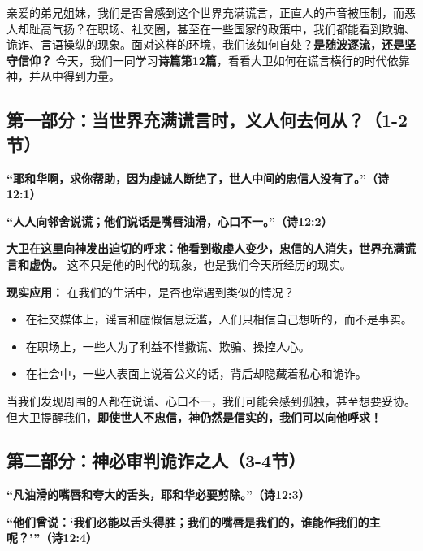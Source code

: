 \documentclass[a4paper, 12pt]{article}
\begin{document}
亲爱的弟兄姐妹，我们是否曾感到这个世界充满谎言，正直人的声音被压制，而恶人却趾高气扬？在职场、社交圈，甚至在一些国家的政策中，我们都能看到欺骗、诡诈、言语操纵的现象。面对这样的环境，我们该如何自处？\textbf{是随波逐流，还是坚守信仰？} 今天，我们一同学习\textbf{诗篇第12篇}，看看大卫如何在谎言横行的时代依靠神，并从中得到力量。  




\subsection*{第一部分：当世界充满谎言时，义人何去何从？（1-2节）}


\hspace{0.4cm}\textbf{“耶和华啊，求你帮助，因为虔诚人断绝了，世人中间的忠信人没有了。”（诗12:1）  }

\textbf{“人人向邻舍说谎；他们说话是嘴唇油滑，心口不一。”（诗12:2）  }

\vspace{0.2cm}

\textbf{大卫在这里向神发出迫切的呼求：他看到敬虔人变少，忠信的人消失，世界充满谎言和虚伪。} 这不只是他的时代的现象，也是我们今天所经历的现实。

\vspace{0.2cm}

\textbf{现实应用： } 
在我们的生活中，是否也常遇到类似的情况？  

\begin{itemize}
     \item 在社交媒体上，谣言和虚假信息泛滥，人们只相信自己想听的，而不是事实。
     \item 在职场上，一些人为了利益不惜撒谎、欺骗、操控人心。
     \item 在社会中，一些人表面上说着公义的话，背后却隐藏着私心和诡诈。
\end{itemize}

当我们发现周围的人都在说谎、心口不一，我们可能会感到孤独，甚至想要妥协。但大卫提醒我们，\textbf{即使世人不忠信，神仍然是信实的，我们可以向他呼求！ } 



\subsection*{第二部分：神必审判诡诈之人（3-4节）}

\hspace{0.4cm}\textbf{“凡油滑的嘴唇和夸大的舌头，耶和华必要剪除。”（诗12:3）  }

\textbf{“他们曾说：‘我们必能以舌头得胜；我们的嘴唇是我们的，谁能作我们的主呢？’”（诗12:4） } 
\end{document}
